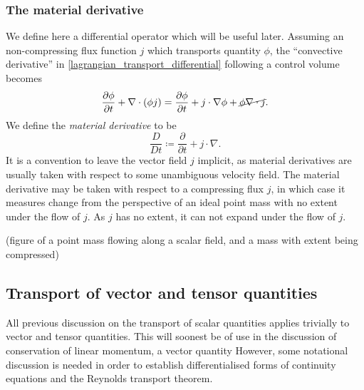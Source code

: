 \documentclass[11pt,a4paper]{memoir}
\newcommand{\Part}[2]{\frac{\partial #1}{\partial #2}}
\begin{document}
\subsubsection{The material derivative}
We define here a differential operator which will be useful later.
Assuming an non-compressing flux function $j$ which transports quantity $\phi$, the ``convective derivative'' in
\eqref{lagrangian_transport_differential} following a control volume becomes
\begin{equation}
    \Part{\phi}{t} + \nabla\cdot(\phi j) = \Part{\phi}{t} + j\cdot\nabla\phi + \cancel{\phi \nabla\cdot j}.
\end{equation}
We define the \textit{material derivative} to be
\begin{equation}\label{material_derivative}
    \frac{D}{Dt} \coloneqq \Part{}{t} + j\cdot\nabla.
\end{equation}
It is a convention to leave the vector field $j$ implicit, as material derivatives are usually taken with respect to some unambiguous velocity field.
The material derivative may be taken with respect to a compressing flux $j$, in which case it measures change from the perspective of an
ideal point mass with no extent under the flow of $j$. As $j$ has no extent, it can not expand under the flow of $j$.

\vskip 0.2in
(figure of a point mass flowing along a scalar field, and a mass with extent being compressed)
\vskip 0.2in

\subsection{Transport of vector and tensor quantities}
All previous discussion on the transport of scalar quantities applies trivially to vector and tensor quantities.
This will soonest be of use in the discussion of conservation of linear momentum, a vector quantity
However, some notational discussion is needed in order to establish differentialised forms of continuity equations and the Reynolds transport theorem.
\end{document}
